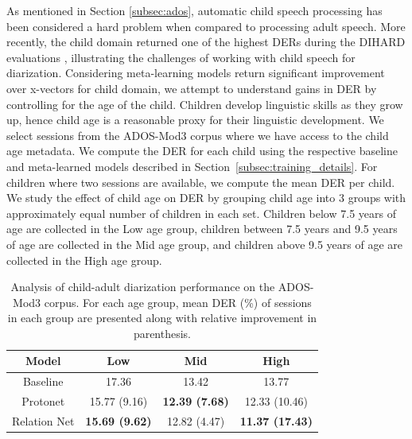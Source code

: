 As mentioned in Section \ref{subsec:ados}, 
automatic child speech processing has been considered a hard problem when compared to processing adult speech.
More recently, the child domain returned one of the highest DERs during the DIHARD evaluations \cite{Xie2019}, illustrating the challenges of working with child speech for diarization.
Considering meta-learning models return significant improvement over x-vectors for child domain, we attempt to understand gains in DER by controlling for the age of the child. Children develop linguistic skills as they grow up, hence child age is a reasonable proxy for their linguistic development. 
We select sessions from the ADOS-Mod3 corpus where we have access to the child age metadata.
We compute the DER for each child using the respective baseline and meta-learned models described in Section~\ref{subsec:training_details}. For children where two sessions are available, we compute the mean DER per child. We study the effect of child age on DER by grouping child age into 3 groups with approximately equal number of children in each set. Children below 7.5 years of age are collected in the Low age group, children between 7.5 years and 9.5 years of age are collected in the Mid age group, and children above 9.5 years of age are collected in the High age group.

\begin{table}[h]
\caption{Analysis of child-adult diarization performance on the ADOS-Mod3 corpus. For each age group, mean DER (\%) of sessions in each group are presented along with relative improvement in parenthesis.}
\label{tab:age_expt}
\centering
\begin{tabular}{cccc} \\ \hline
Model & Low & Mid & High \\ \hline
\rule{0pt}{3ex} Baseline & 17.36 & 13.42 & 13.77 \\
\rule{0pt}{3ex} Protonet & 15.77 (9.16) & \textbf{12.39 (7.68)} & 12.33 (10.46)\\
\rule{0pt}{3ex} Relation Net & \textbf{15.69 (9.62)} & 12.82 (4.47) & \textbf{11.37 (17.43)} \\ \hline
\end{tabular}
\end{table}


